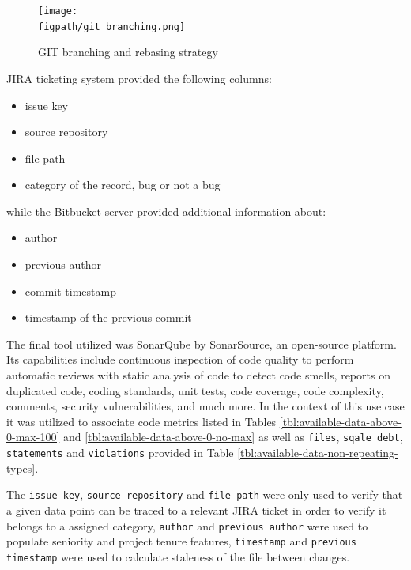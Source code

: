 \begin{figure}[!h]
    \centering
    \texttt{[image: \\figpath/git\_branching.png]}
    \caption{GIT branching and rebasing strategy}
    \label{fig:git-branching-merging-and-rebasing}
\end{figure}

JIRA ticketing system provided the following columns:
\begin{itemize}
    \item issue key
    \item source repository
    \item file path
    \item category of the record, bug or not a bug
\end{itemize}

while the Bitbucket server provided additional information about:
\begin{itemize}\label{lst:design:info-from-bitbucket}
    \item author
    \item previous author
    \item commit timestamp
    \item timestamp of the previous commit
\end{itemize}

The final tool utilized was SonarQube by SonarSource, an open-source platform. Its capabilities include continuous inspection of code quality to perform automatic reviews with static analysis of code to detect code smells, reports on duplicated code, coding standards, unit tests, code coverage, code complexity, comments,  security vulnerabilities, and much more. In the context of this use case it was utilized to associate code metrics listed in Tables \ref{tbl:available-data-above-0-max-100} and \ref{tbl:available-data-above-0-no-max} as well as \texttt{files}, \texttt{sqale debt}, \texttt{statements} and \texttt{violations} provided in Table \ref{tbl:available-data-non-repeating-types}.

The \texttt{issue key}, \texttt{source repository} and \texttt{file path} were only used to verify that a given data point can be traced to a relevant JIRA ticket in order to verify it belongs to a assigned category, \texttt{author} and \texttt{previous author} were used to populate seniority and project tenure features, \texttt{timestamp} and \texttt{previous timestamp} were used to calculate staleness of the file between changes.



